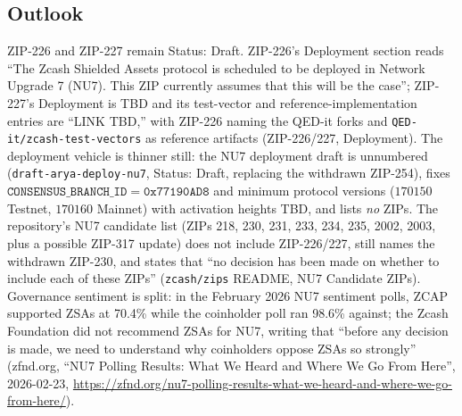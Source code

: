 \documentclass[11pt,a4paper]{article}
\theoremstyle{definition}
\begin{document}
\subsection{Outlook}\label{sec:zsa-outlook}

ZIP-226 and ZIP-227 remain Status: Draft. ZIP-226's Deployment section reads
``The Zcash Shielded Assets protocol is scheduled to be deployed in Network
Upgrade 7 (NU7). This ZIP currently assumes that this will be the case'';
ZIP-227's Deployment is TBD and its test-vector and reference-implementation
entries are ``LINK TBD,'' with ZIP-226 naming the QED-it forks and
\texttt{QED-it/zcash-test-vectors} as reference artifacts (ZIP-226/227,
Deployment). The deployment vehicle is thinner still: the NU7 deployment
draft is unnumbered (\texttt{draft-arya-deploy-nu7}, Status: Draft,
replacing the withdrawn ZIP-254), fixes
$\texttt{CONSENSUS\_BRANCH\_ID} = \mathtt{0x77190AD8}$ and minimum protocol
versions ($170150$ Testnet, $170160$ Mainnet) with activation heights TBD,
and lists \emph{no} ZIPs. The repository's NU7 candidate list (ZIPs 218,
230, 231, 233, 234, 235, 2002, 2003, plus a possible ZIP-317 update) does
not include ZIP-226/227, still names the withdrawn ZIP-230, and states that
``no decision has been made on whether to include each of these ZIPs''
(\texttt{zcash/zips} README, NU7 Candidate ZIPs). Governance sentiment is
split: in the February 2026 NU7 sentiment polls, ZCAP supported ZSAs at
70.4\% while the coinholder poll ran 98.6\% against; the Zcash Foundation
did not recommend ZSAs for NU7, writing that ``before any decision is
made, we need to understand why coinholders oppose ZSAs so strongly''
(zfnd.org, ``NU7 Polling Results: What We Heard and Where We Go From
Here'', 2026-02-23,
\url{https://zfnd.org/nu7-polling-results-what-we-heard-and-where-we-go-from-here/}).
\end{document}
